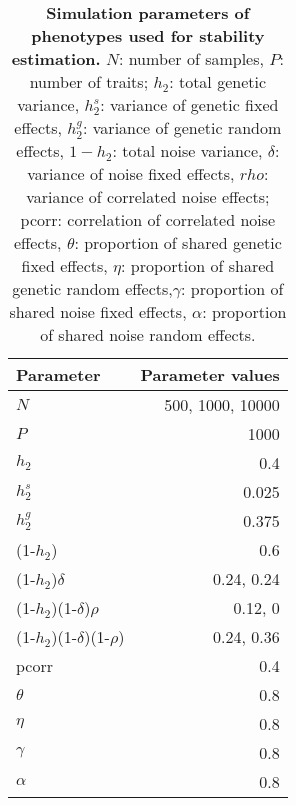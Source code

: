 \begin{table}[h]
  \centering
  \caption[\textbf{Simulation parameters of phenotypes used for stability estimation. }]{\textbf{Simulation parameters of phenotypes used for stability estimation. }\(N\): number of samples, \(P\): number of traits; \(h_2\): total genetic variance, \(h_2^s\): variance of genetic  fixed effects, \(h_2^g\): variance of genetic random effects, \(1 - h_2\): total noise variance, \(\delta\): variance of noise fixed effects, \(rho\): variance of correlated noise effects; pcorr: correlation of correlated noise effects, \(\theta\): proportion of shared genetic fixed effects, \(\eta\):  proportion of shared genetic random effects,\(\gamma\): proportion of shared noise fixed effects, \(\alpha\): proportion of shared noise random effects.}
    \begin{tabular}{lr}
    \toprule
    Parameter & Parameter values \\
    \midrule
    \(N\) & \num{500}, \num{1000}, \num{10000} \\
    \(P\) & \num{1000} \\
    \addlinespace[1.5ex]
    \(h_2\) & 0.4 \\
    \(h_2^s\) & 0.025 \\
    \(h_2^g\) & 0.375 \\
   \addlinespace[1.5ex]
    (1-\(h_2\)) & 0.6 \\
    (1-\(h_2\))\(\delta\) & 0.24, 0.24 \\
    (1-\(h_2\))(1-\(\delta\))\(\rho\) & 0.12, 0 \\
    (1-\(h_2\))(1-\(\delta\))(1-\(\rho\)) & 0.24, 0.36 \\
   \addlinespace[1.5ex]
    pcorr & 0.4 \\
    \(\theta\) & 0.8 \\
    \(\eta\) & 0.8 \\
    \(\gamma\) & 0.8 \\
    \(\alpha\) & 0.8 \\
    \bottomrule
    \end{tabular}%
  \label{tab:parametersSimulationDimRed}%
\end{table}%


